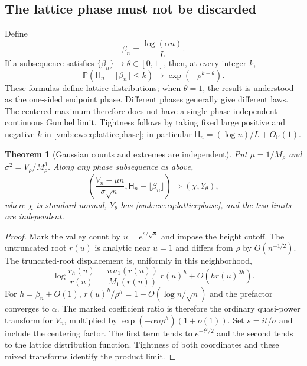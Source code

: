 \documentclass[11pt,a4paper]{article}
\numberwithin{equation}{section}
\newtheorem{theorem}{Theorem}[section]
\theoremstyle{definition}\newtheorem{definition}[theorem]{Definition}
\theoremstyle{remark}\newtheorem{remark}[theorem]{Remark}
\newcommand{\Prob}{\mathbb P}
\begin{document}
\subsection{The lattice phase must not be discarded}
Define
\begin{equation}\label{vmb:cw:eq:center}
 \beta_n=\frac{\log(\alpha n)}L.
\end{equation}
If a subsequence satisfies $\{\beta_n\}\to\theta\in[0,1]$, then, at every
integer $k$,
\begin{equation}\label{vmb:cw:eq:latticephase}
 \Prob(\mathsf H_n-\lfloor \beta_n\rfloor\le k)
 \longrightarrow\exp\left(-\rho^{k-\theta}\right).
\end{equation}
These formulas define lattice distributions; when $\theta=1$, the result
is understood as the one-sided endpoint phase. Different phases generally
give different laws. The centered maximum therefore does not have a single
phase-independent continuous Gumbel limit. Tightness follows by taking
fixed large positive and negative $k$ in \eqref{vmb:cw:eq:latticephase}; in
particular $\mathsf H_n=(\log n)/L+O_{\Prob}(1)$.

\begin{theorem}[Gaussian counts and extremes are independent]\label{vmb:cw:thm:independent}
Put $\mu=1/M_\rho$ and $\sigma^2=V_\rho/M_\rho^3$. Along any phase
subsequence as above,
\begin{equation}\label{vmb:cw:eq:independence}
 \left(\frac{V_n-\mu n}{\sigma\sqrt n},
       \mathsf H_n-\lfloor \beta_n\rfloor\right)
 \Longrightarrow (\chi,Y_\theta),
\end{equation}
where $\chi$ is standard normal, $Y_\theta$ has \eqref{vmb:cw:eq:latticephase}, and
the two limits are independent.
\end{theorem}
\begin{proof}
Mark the valley count by $u=e^{s/\sqrt n}$ and impose the height cutoff.
The untruncated root $r(u)$ is analytic near $u=1$ and differs from $\rho$
by $O(n^{-1/2})$. The truncated-root displacement is, uniformly in this
neighborhood,
\[
 \log\frac{r_h(u)}{r(u)}=
 \frac{u\,a_1(r(u))}{M_1(r(u))}\,r(u)^h
 +O(hr(u)^{2h}).
\]
For $h=\beta_n+O(1)$,
$r(u)^h/\rho^h=1+O(\log n/\sqrt n)$ and the prefactor converges to
$\alpha$. The marked coefficient ratio is therefore the ordinary
quasi-power transform for $V_n$, multiplied by
$\exp(-\alpha n\rho^h)(1+o(1))$. Set $s=it/\sigma$ and include the
centering factor. The first term tends to $e^{-t^2/2}$ and the second tends
to the lattice distribution function. Tightness of both coordinates and
these mixed transforms identify the product limit.
\end{proof}
\end{document}
